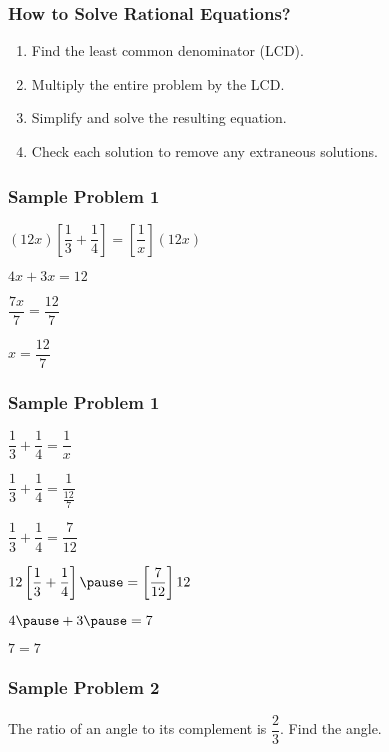 \documentclass[14pt]{beamer}
\begin{document}
    \begin{frame}
    	\frametitle{How to Solve Rational Equations?}
    	\begin{enumerate}
    		\item Find the least common denominator (LCD).
    		\item Multiply the entire problem by the LCD.
    		\item Simplify and solve the resulting equation.
    		\item Check each solution to remove any extraneous solutions.
    	\end{enumerate}
    \end{frame}

    \begin{frame}
    	\frametitle{Sample Problem 1}
    	$ (12x)\left[\dfrac{1}{3} + \dfrac{1}{4} \right] = \left[\dfrac{1}{x} \right](12x)$
    	
    	\vspace{1em} $ 4x  + 3x  = 12 $
    	
    	\vspace{1em} $ \dfrac{7x}{7} = \dfrac{12}{7} $
    	
    	$ x = \dfrac{12}{7} $
    \end{frame}

    \begin{frame}
    	\frametitle{Sample Problem 1}
    	$ \dfrac{1}{3} + \dfrac{1}{4} = \dfrac{1}{x}$
    	
    	\pause \vspace{1em} $ \dfrac{1}{3} + \dfrac{1}{4} = \dfrac{1}{\frac{12}{7}}$
    	
    	\pause \vspace{1em} $ \dfrac{1}{3} + \dfrac{1}{4} = \dfrac{7}{12} $
    	
    	\pause \vspace{1em} $ 12\left[\dfrac{1}{3} + \dfrac{1}{4} \right] \pause = \left[\dfrac{7}{12} \right]12 $
    	
    	\pause \vspace{1em} $ 4 \pause + 3 \pause = 7 $
    	
    	\pause \vspace{1em} $ 7 = 7 $ \pause \redcheck
    	
    	\pause {}
    \end{frame}

    \begin{frame}
    	\frametitle{Sample Problem 2}
    	The ratio of an angle to its complement is $ \dfrac{2}{3} $. Find the angle.
    \end{frame}
\end{document}
